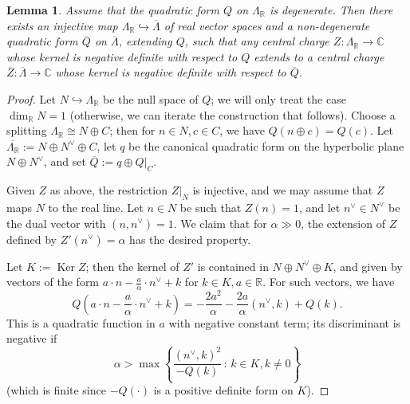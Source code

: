 \documentclass[leqno,11pt,twoside]{amsart}
\newtheorem{Lem}[Thm]{Lemma}
\theoremstyle{definition}
\begin{document}
\begin{Lem}
Assume that the quadratic form $Q$ on $\Lambda_{\ensuremath{\mathbb{R}}}$ is degenerate. Then there exists an injective map $\Lambda_{\ensuremath{\mathbb{R}}} {\ensuremath{\hookrightarrow}} \overline{\Lambda}$ of real vector spaces and a non-degenerate quadratic form $\overline{Q}$ on $\overline{\Lambda}$, extending $Q$, such that any central charge
$Z \colon \Lambda_{\ensuremath{\mathbb{R}}} \to {\ensuremath{\mathbb{C}}}$ whose kernel is negative definite with respect to $Q$ extends to a central charge
$\overline{Z} \colon \overline{\Lambda} \to {\ensuremath{\mathbb{C}}}$ whose kernel is negative definite with respect to $\overline{Q}$.
\end{Lem}
\begin{proof}
Let $N {\ensuremath{\hookrightarrow}} \Lambda_{\ensuremath{\mathbb{R}}}$ be the null space of $Q$; we will only treat the case ${\mathop{\mathrm{dim}}\nolimits}_{\ensuremath{\mathbb{R}}} N = 1$
(otherwise, we can iterate the construction that follows). Choose a splitting $\Lambda_{\ensuremath{\mathbb{R}}} \cong N
\oplus C$; then for $n \in N, c \in C$, we have $Q(n \oplus c) = Q(c)$. Let
$\overline{\Lambda_{\ensuremath{\mathbb{R}}}} := N \oplus N^\vee \oplus C$, let $q$ be the canonical quadratic form on
the hyperbolic plane $N \oplus N^\vee$, and set $\overline{Q} := q \oplus Q|_C$. 

Given $Z$ as above, the restriction $Z|_N$ is  injective, and we may
assume that $Z$ maps $N$ to the real line. Let $n \in N$ be such that $Z(n) = 1$, and let
$n^\vee \in N^\vee$ be the dual vector with $(n, n^\vee) = 1$. We claim that for $\alpha \gg 0$,
the extension of $Z$ defined by $Z'(n^\vee) = \alpha$ has the desired property.

Let $K := {\mathop{\mathrm{Ker}}\nolimits} Z$; then the kernel of $Z'$ is contained in $N \oplus N^\vee \oplus K$, and
given by vectors of the form $a \cdot n - \frac{a}{\alpha}\cdot n^\vee + k$ for $k \in K, a \in {\ensuremath{\mathbb{R}}}$.
For such vectors, we have
\[
 Q\left(a\cdot n  - \frac{a}{\alpha}\cdot n^\vee + k \right)
= - \frac{2a^2}{\alpha} - \frac{2a}{\alpha}(n^\vee, k) + Q(k).
\]
This is a quadratic function in $a$ with negative constant term; its discriminant is negative if
\[ \alpha > \max {\left\{{\frac{(n^\vee, k)^2}{-Q(k)}}\,\colon\,{k \in K, k \neq 0}\right\}} \]
(which is finite since $-Q(\cdot)$ is a positive definite form on $K$).
\end{proof}
\end{document}
